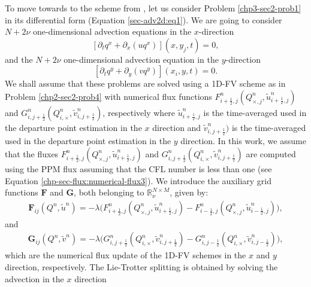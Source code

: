 To move towards to the scheme from  \citet{lin:1996}, let us consider Problem \ref{chp3-sec2-prob1}
in its differential form (Equation \eqref{sec-adv2d:eq1}).
We are going to consider $N+2\nu$ one-dimensional advection equations in the $x$-direction
\begin{equation*}
	\label{chp3-adv2deq-xdir1}
	[{\partial_t q^x}+{\partial_x (uq^x)}](x, y_j, t)
	= 0,
\end{equation*}
and the $N+2\nu$ one-dimensional advection equation in the $y$-direction
\begin{equation*}
	\label{chp3-adv2deq-ydir1}
	[{\partial_t q^y} +{\partial_y (vq^y)}](x_i, y, t) = 0.   
\end{equation*}
We shall assume that these problems are solved using a 1D-FV scheme as in Problem \ref{chp2-sec2-prob4}
with numerical flux functions ${F}_{i+\frac{1}{2},j}^n(Q^n_{\times,j},\tilde{u}^n_{i+\frac{1}{2},j})$ and
${G}^n_{i,j+\frac{1}{2}}(Q^n_{i,\times},\tilde{v}^n_{i,j+\frac{1}{2}})$, respectively
where $\tilde{u}^n_{i+\frac{1}{2},j}$ is the time-averaged used in the departure point estimation in the $x$ direction
and $\tilde{v}^n_{i,j+\frac{1}{2}})$ is the time-averaged used in the departure point estimation in the $y$ direction.
In this work, we assume that the fluxes ${F}_{i+\frac{1}{2},j}^n(Q^n_{\times,j},\tilde{u}^n_{i+\frac{1}{2},j})$ and
${G}^n_{i,j+\frac{1}{2}}(Q^n_{i,\times} ,\tilde{v}^n_{i,j+\frac{1}{2}})$ are computed using the PPM flux
assuming that the CFL number is less than one (see Equation \eqref{chp-sec-flux:numerical-flux3}).
We introduce the auxiliary grid functions $\mathbf{F}$ and $\mathbf{G}$, both belonging to $\mathbb{R}^{N\times M}_{\nu}$, given by:
\begin{align*}
	\mathbf{F}_{ij}({Q^n,\tilde{u}^n}) = -\lambda \big({F}_{i+\frac{1}{2},j}^n(Q^n_{\times,j},\tilde{u}^n_{i+\frac{1}{2},j})-
                                                  {F}_{i-\frac{1}{2},j}^n(Q^n_{\times,j},\tilde{u}^n_{i-\frac{1}{2},j}) \big),
\end{align*}
and
\begin{align*}
	\mathbf{G}_{ij}({Q^n,\tilde{v}^n}) = -\lambda \big({G}_{i,j+\frac{1}{2}}^n(Q^n_{i,\times},\tilde{v}^n_{i,j+\frac{1}{2}})-
                                                  {G}_{i,j-\frac{1}{2}}^n(Q^n_{i,\times},\tilde{v}^n_{i,j-\frac{1}{2}}) \big),
\end{align*}
which are the numerical flux update of the 1D-FV schemes in the $x$ and $y$ direction, respectively.
The Lie-Trotter splitting is obtained by solving the advection in the $x$ direction
